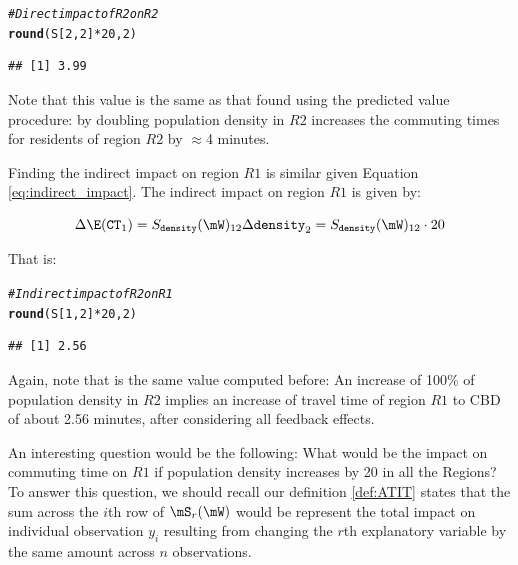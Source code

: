 \documentclass[english,12pt]{book}\usepackage[]{graphicx}\usepackage[]{xcolor}
\makeatletter
\newcommand{\hlnum}[1]{\textcolor[rgb]{0.686,0.059,0.569}{#1}}%
\newcommand{\hlcom}[1]{\textcolor[rgb]{0.678,0.584,0.686}{\textit{#1}}}%
\newcommand{\hlopt}[1]{\textcolor[rgb]{0,0,0}{#1}}%
\newcommand{\hldef}[1]{\textcolor[rgb]{0.345,0.345,0.345}{#1}}%
\newcommand{\hlkwd}[1]{\textcolor[rgb]{0.737,0.353,0.396}{\textbf{#1}}}%
\newenvironment{kframe}{%
 \def\at@end@of@kframe{}%
 \ifinner\ifhmode%
  \def\at@end@of@kframe{\end{minipage}}%
  \begin{minipage}{\columnwidth}%
 \fi\fi%
 \def\FrameCommand##1{\hskip\@totalleftmargin \hskip-\fboxsep
 \colorbox{shadecolor}{##1}\hskip-\fboxsep
     \hskip-\linewidth \hskip-\@totalleftmargin \hskip\columnwidth}%
 \MakeFramed {\advance\hsize-\width
   \@totalleftmargin\z@ \linewidth\hsize
   \@setminipage}}%
 {\par\unskip\endMakeFramed%
 \at@end@of@kframe}
\newenvironment{knitrout}{}{} %
\makeatother
\begin{document}
\begin{knitrout}
\color{fgcolor}\begin{kframe}
\begin{alltt}
\hlcom{# Direct impact of R2 on R2}
\hlkwd{round}\hldef{(S[}\hlnum{2}\hldef{,}\hlnum{2}\hldef{]} \hlopt{*} \hlnum{20}\hldef{,} \hlnum{2}\hldef{)}
\end{alltt}
\begin{verbatim}
## [1] 3.99
\end{verbatim}
\end{kframe}
\end{knitrout}

Note that this value is the same as that found using the predicted value procedure:  by doubling population density in  $R2$  increases the commuting times for residents of region $R2$ by $\approx$4 minutes. 

Finding the indirect impact on region $R1$ is similar given Equation \ref{eq:indirect_impact}. The indirect impact on region $R1$ is given by:

\begin{equation*}
  \Delta \E(\texttt{CT}_1) = S_{\texttt{density}}(\mW)_{12} \Delta \texttt{density}_{2} = S_{\texttt{density}}(\mW)_{12} \cdot 20
\end{equation*}

That is:

\begin{knitrout}
\color{fgcolor}\begin{kframe}
\begin{alltt}
\hlcom{# Indirect impact of R2 on R1}
\hlkwd{round}\hldef{(S[}\hlnum{1}\hldef{,}\hlnum{2}\hldef{]} \hlopt{*} \hlnum{20}\hldef{,} \hlnum{2}\hldef{)}
\end{alltt}
\begin{verbatim}
## [1] 2.56
\end{verbatim}
\end{kframe}
\end{knitrout}

Again, note that is the same value computed before: An increase of 100\% of population density in $R2$ implies an increase of travel time of region $R1$ to CBD of about 2.56 minutes, after considering all feedback effects. 


An interesting question would be the following: What would be the impact on commuting time on $R1$ if population density increases by 20 in all the Regions? To answer this question, we should recall our definition \ref{def:ATIT} states that the sum across the $i$th row of $\mS_{r}(\mW)$ would be represent the total impact on individual observation $y_i$ resulting from changing the $r$th explanatory variable by the same amount across $n$ observations. 
   
\end{document}
